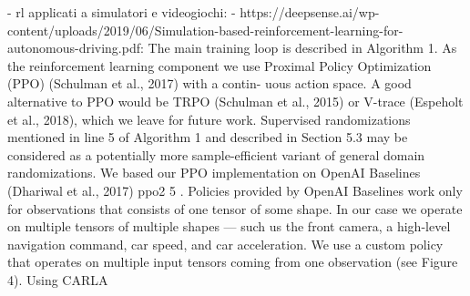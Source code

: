 	- rl applicati a simulatori e videogiochi:
		- https://deepsense.ai/wp-content/uploads/2019/06/Simulation-based-reinforcement-learning-for-autonomous-driving.pdf:
		The main training loop is described in Algorithm 1. As the reinforcement learning component we use Proximal Policy Optimization (PPO) (Schulman et al., 2017) with a contin-
uous action space. A good alternative to PPO would be TRPO (Schulman et al., 2015) or V-trace (Espeholt et al., 2018), which we leave for future work. Supervised randomizations mentioned in line 5 of Algorithm 1 and described in Section 5.3 may be considered as a potentially more sample-efficient variant of general domain randomizations. We based our PPO implementation on OpenAI Baselines (Dhariwal et al., 2017) ppo2 5 . Policies provided by OpenAI Baselines work only for observations that consists of one tensor of some shape. In our case we operate on multiple tensors of multiple shapes — such us the front camera,
a high-level navigation command, car speed, and car acceleration. We use a custom policy that operates on multiple input tensors coming from one observation (see Figure 4).	
	Using CARLA

	
	
	
	
